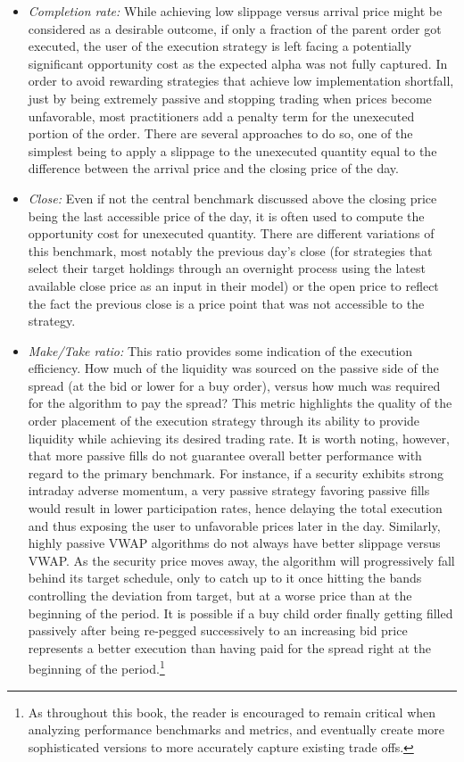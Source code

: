 \begin{itemize}
\item \emph{Completion rate:} While achieving low slippage versus arrival price might be considered as a desirable outcome, if only a fraction of the parent order got executed, the user of the execution strategy is left facing a potentially significant opportunity cost as the expected alpha was not fully captured. In order to avoid rewarding strategies that achieve low implementation shortfall, just by being extremely passive and stopping trading when prices become unfavorable, most practitioners add a penalty term for the unexecuted portion of the order. There are several approaches to do so, one of the simplest being to apply a slippage to the unexecuted quantity equal to the difference between the arrival price and the closing price of the day. 

\item \emph{Close:} Even if not the central benchmark discussed above the closing price being the last accessible price of the day, it is often used to compute the opportunity cost for unexecuted quantity. 
There are different variations of this benchmark, most notably the previous day's close (for strategies that select their target holdings through an overnight process using the latest available close price as an input in their model) or the open price to reflect the fact the previous close is a price point that was not accessible to the strategy.

\item \emph{Make/Take ratio:} This ratio provides some indication of the execution efficiency. How much of the liquidity was sourced on the passive side of the spread (at the bid or lower for a buy order), versus how much was required for the algorithm to pay the spread? This metric highlights the quality of the order placement of the execution strategy through its ability to provide liquidity while achieving its desired trading rate. It is worth noting, however, that more passive fills do not guarantee overall better performance with regard to the primary benchmark. For instance, if a security exhibits strong intraday adverse momentum, a very passive strategy favoring passive fills would result in lower participation rates, hence delaying the total execution and thus exposing the user to unfavorable prices later in the day. Similarly, highly passive VWAP algorithms do not always have better slippage versus VWAP. As the security price moves away, the algorithm will progressively fall behind its target schedule, only to catch up to it once hitting the bands controlling the deviation from target, but at a worse price than at the beginning of the period. It is possible if a buy child order finally getting filled passively after being re-pegged successively to an increasing bid price represents a better execution than having paid for the spread right at the beginning of the period.\footnote{As throughout this book, the reader is encouraged to remain critical when analyzing performance benchmarks and metrics, and eventually create more sophisticated versions to more accurately capture existing trade offs.}


\end{itemize}
